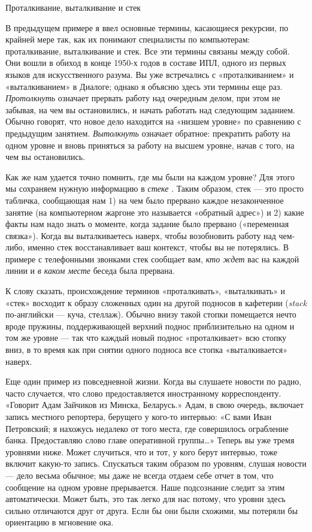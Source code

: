 Проталкивание, выталкивание и стек

В предыдущем примере я ввел основные термины, касающиеся рекурсии, по крайней мере так, как их понимают специалисты по компьютерам: проталкивание, выталкивание и стек. Все эти термины связаны между собой. Они вошли в обиход в конце 1950-х годов в составе ИПЛ, одного из первых языков для искусственного разума. Вы уже встречались с «проталкиванием» и «выталкиванием» в Диалоге; однако я объясню здесь эти термины еще раз. \emph{Протолкнуть} означает прервать работу над очередным делом, при этом не забывая, на чем вы остановились, и начать работать над следующим заданием. Обычно говорят, что новое дело находится на «низшем уровне» по сравнению с предыдущим занятием. \emph{Вытолкнуть} означает обратное: прекратить работу на одном уровне и вновь приняться за работу на высшем уровне, начав с того, на чем вы остановились.

Как же нам удается точно помнить, где мы были на каждом уровне? Для этого мы сохраняем нужную информацию в \emph{стеке} . Таким образом, стек --- это просто табличка, сообщающая нам 1) на чем было прервано каждое незаконченное занятие (на компьютерном жаргоне это называется «обратный адрес») и 2) какие факты нам надо знать о моменте, когда задание было прервано («переменная связка»). Когда вы выталкиваетесь наверх, чтобы возобновить работу над чем-либо, именно стек восстанавливает ваш контекст, чтобы вы не потерялись. В примере с телефонными звонками стек сообщает вам, \emph{кто ждет} вас на каждой линии и \emph{в каком месте} беседа была прервана.

К слову сказать, происхождение терминов «проталкивать», «выталкивать» и «стек» восходит к образу сложенных один на другой подносов в кафетерии (\emph{stack} по-английски --- куча, стеллаж). Обычно внизу такой стопки помещается нечто вроде пружины, поддерживающей верхний поднос приблизительно на одном и том же уровне --- так что каждый новый поднос «проталкивает» всю стопку вниз, в то время как при снятии одного подноса все стопка «выталкивается» наверх.

Еще один пример из повседневной жизни. Когда вы слушаете новости по радио, часто случается, что слово предоставляется иностранному корреспонденту. «Говорит Адам Зайчиков из Минска, Беларусь.» Адам, в свою очередь, включает запись местного репортера, берущего у кого-то интервью: «С вами Иван Петровский; я нахожусь недалеко от того места, где совершилось ограбление банка. Предоставляю слово главе оперативной группы\ldots» Теперь вы уже тремя уровнями ниже. Может случиться, что и тот, у кого берут интервью, тоже включит какую-то запись. Спускаться таким образом по уровням, слушая новости --- дело весьма обычное; мы даже не всегда отдаем себе отчет в том, что сообщение на одном уровне прерывается. Наше подсознание следит за этим автоматически. Может быть, это так легко для нас потому, что уровни здесь сильно отличаются друг от друга. Если бы они были схожими, мы потеряли бы ориентацию в мгновение ока.

